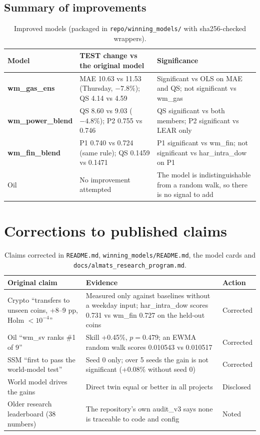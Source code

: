 \documentclass[10pt,a4paper]{article}
\newcommand{\src}[1]{{\footnotesize\texttt{#1}}}
\newcommand{\new}[1]{\textcolor{almaorange}{\textbf{#1}}}
\begin{document}
\subsection{Summary of improvements}
\begin{table}[H]
\centering\small
\caption{Improved models (packaged in \src{repo/winning\_models/} with sha256-checked wrappers).}
\label{tab:impsum}
\begin{tabularx}{\linewidth}{@{}lXX@{}}
\toprule
Model & TEST change vs the original model & Significance\\
\midrule
\new{wm\_gas\_ens} & MAE 10.63 vs 11.53 (Thursday, $-7.8\%$); QS 4.14 vs 4.59 & Significant vs OLS on MAE and QS; not significant vs wm\_gas\\
\new{wm\_power\_blend} & QS 8.60 vs 9.03 ($-4.8\%$); P2 0.755 vs 0.746 & QS significant vs both members; P2 significant vs LEAR only\\
\new{wm\_fin\_blend} & P1 0.740 vs 0.724 (same rule); QS 0.1459 vs 0.1471 & P1 significant vs wm\_fin; not significant vs har\_intra\_dow on P1\\
Oil & No improvement attempted & The model is indistinguishable from a random walk, so there is no signal to add\\
\bottomrule
\end{tabularx}
\end{table}

\section{Corrections to published claims}
\label{sec:claims}
\begin{table}[H]
\centering\small
\caption{Claims corrected in \src{README.md}, \src{winning\_models/README.md}, the model cards and \src{docs/almats\_research\_program.md}.}
\label{tab:claims}
\begin{tabularx}{\linewidth}{@{}p{4.2cm}Xp{1.7cm}@{}}
\toprule
Original claim & Evidence & Action\\
\midrule
Crypto ``transfers to unseen coins, +8--9 pp, Holm $<10^{-4}$'' & Measured only against baselines without a weekday input; har\_intra\_dow scores 0.731 vs wm\_fin 0.727 on the held-out coins & Corrected\\
Oil ``wm\_sv ranks \#1 of 9'' & Skill +0.45\%, $p=0.479$; an EWMA random walk scores 0.010543 vs 0.010517 & Corrected\\
SSM ``first to pass the world-model test'' & Seed 0 only; over 5 seeds the gain is not significant (+0.08\% without seed 0) & Corrected\\
World model drives the gains & Direct twin equal or better in all projects & Disclosed\\
Older research leaderboard (38 numbers) & The repository's own audit\_v3 says none is traceable to code and config & Noted\\
\bottomrule
\end{tabularx}
\end{table}
\end{document}

